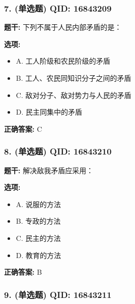 \documentclass[12pt,UTF8]{ctexart}
\begin{document}
\vspace{0.3em}\hrulefill\vspace{0.7em}

\subsubsection*{7. (单选题) \small QID: 16843209}

\textbf{题干:}
下列不属于人民内部矛盾的是：

\textbf{选项:}
\begin{itemize}[leftmargin=*]

  \item A. 工人阶级和农民阶级的矛盾

  \item B. 工人、农民同知识分子之间的矛盾

  \item C. 敌对分子、敌对势力与人民的矛盾

  \item D. 民主同集中的矛盾

\end{itemize}

\textbf{正确答案:}
C

\vspace{0.3em}\hrulefill\vspace{0.7em}

\subsubsection*{8. (单选题) \small QID: 16843210}

\textbf{题干:}
解决敌我矛盾应采用：

\textbf{选项:}
\begin{itemize}[leftmargin=*]

  \item A. 说服的方法

  \item B. 专政的方法

  \item C. 民主的方法

  \item D. 教育的方法

\end{itemize}

\textbf{正确答案:}
B

\vspace{0.3em}\hrulefill\vspace{0.7em}

\subsubsection*{9. (单选题) \small QID: 16843211}
\end{document}
